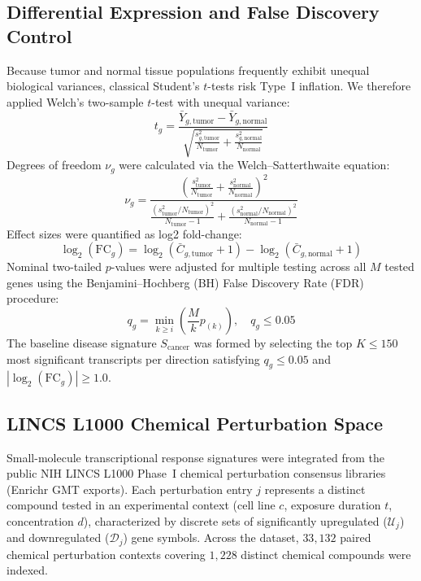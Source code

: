 \documentclass[10pt,journal,compsoc,twocolumn]{IEEEtran}
\begin{document}
\subsection{Differential Expression and False Discovery Control}
Because tumor and normal tissue populations frequently exhibit unequal biological variances, classical Student's $t$-tests risk Type~I inflation. We therefore applied Welch's two-sample $t$-test with unequal variance:
\begin{equation}
    t_g = \frac{\bar{Y}_{g,\text{tumor}} - \bar{Y}_{g,\text{normal}}}{\sqrt{\frac{s_{g,\text{tumor}}^2}{N_{\text{tumor}}} + \frac{s_{g,\text{normal}}^2}{N_{\text{normal}}}}}
\end{equation}
Degrees of freedom $\nu_g$ were calculated via the Welch--Satterthwaite equation:
\begin{equation}
    \nu_g = \frac{\left(\frac{s_{\text{tumor}}^2}{N_{\text{tumor}}} + \frac{s_{\text{normal}}^2}{N_{\text{normal}}}\right)^2}{\frac{(s_{\text{tumor}}^2/N_{\text{tumor}})^2}{N_{\text{tumor}}-1} + \frac{(s_{\text{normal}}^2/N_{\text{normal}})^2}{N_{\text{normal}}-1}}
\end{equation}
Effect sizes were quantified as log2 fold-change:
\begin{equation}
    \log_2(\text{FC}_g) = \log_2(\bar{C}_{g,\text{tumor}} + 1) - \log_2(\bar{C}_{g,\text{normal}} + 1)
\end{equation}
Nominal two-tailed $p$-values were adjusted for multiple testing across all $M$ tested genes using the Benjamini--Hochberg (BH) False Discovery Rate (FDR) procedure:
\begin{equation}
    q_g = \min_{k \ge i} \left( \frac{M}{k} p_{(k)} \right), \quad q_g \le 0.05
\end{equation}
The baseline disease signature $S_{\text{cancer}}$ was formed by selecting the top $K \le 150$ most significant transcripts per direction satisfying $q_g \le 0.05$ and $|\log_2(\text{FC}_g)| \ge 1.0$.

\subsection{LINCS L1000 Chemical Perturbation Space}
Small-molecule transcriptional response signatures were integrated from the public NIH LINCS L1000 Phase~I chemical perturbation consensus libraries (Enrichr GMT exports). Each perturbation entry $j$ represents a distinct compound tested in an experimental context (cell line $c$, exposure duration $t$, concentration $d$), characterized by discrete sets of significantly upregulated ($\mathcal{U}_j$) and downregulated ($\mathcal{D}_j$) gene symbols. Across the dataset, $33,132$ paired chemical perturbation contexts covering $1,228$ distinct chemical compounds were indexed.
\end{document}
